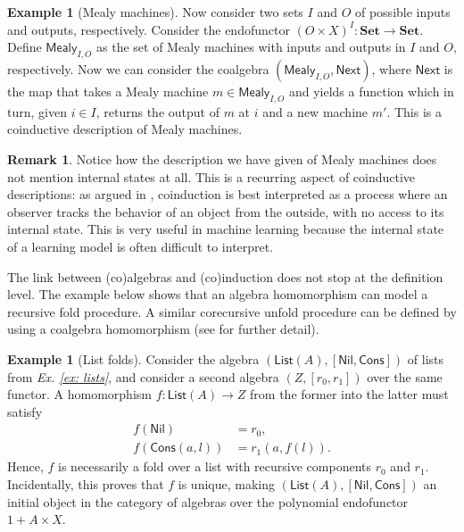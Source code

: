 \documentclass[11pt,a4paper,openright,twoside]{report}
\newcounter{mycounter}
\theoremstyle{plain}
\theoremstyle{definition}
\newtheorem{remark}[mycounter]{Remark}
\newtheorem{example}[mycounter]{Example}
\begin{document}
\begin{example}[Mealy machines]
  \label{ex: mealy}
  Now consider two sets $I$ and $O$ of possible inputs and outputs, respectively. Consider the endofunctor $(O \times X)^I: \mathbf{Set} \to \mathbf{Set}$.  Define $\mathsf{Mealy}_{I,O}$ as the set of Mealy machines with inputs and outputs in $I$ and $O$, respectively. Now we can consider the coalgebra $(\mathsf{Mealy}_{I,O}, \mathsf{Next})$, where $\mathsf{Next}$ is the map that takes a Mealy machine $m \in \mathsf{Mealy}_{I,O}$ and yields a function which in turn, given $i \in I$, returns the output of $m$ at $i$ and a new machine $m'$. This is a coinductive description of Mealy machines.
\end{example}

\begin{remark}
  Notice how the description we have given of Mealy machines does not mention internal states at all. This is a recurring aspect of coinductive descriptions: as argued in \cite{jacobs1997tutorial}, coinduction is best interpreted as a process where an observer tracks the behavior of an object from the outside, with no access to its internal state. This is very useful in machine learning because the internal state of a learning model is often difficult to interpret.
\end{remark}

The link between (co)algebras and (co)induction does not stop at the definition level. The example below shows that an algebra homomorphism can model a recursive fold procedure. A similar corecursive unfold procedure can be defined by using a coalgebra homomorphism (see \cite{gavranovicposition} for further detail).

\begin{example}[List folds]
  \label{ex: listfold}
  Consider the algebra $(\mathsf{List}(A), [\mathsf{Nil}, \mathsf{Cons}])$ of lists from \textit{Ex. \ref{ex: lists}}, and consider a second algebra $(Z, [r_0,r_1])$ over the same functor. A homomorphism $f: \mathsf{List}(A) \to Z$ from the former into the latter must satisfy 
  \begin{align*}
    f(\mathsf{Nil}) &= r_0,\\
    f(\mathsf{Cons}(a,l)) &= r_1(a,f(l)). 
  \end{align*}
  Hence, $f$ is necessarily a fold over a list with recursive components $r_0$ and $r_1$. Incidentally, this proves that $f$ is unique, making $(\mathsf{List}(A), [\mathsf{Nil}, \mathsf{Cons}])$ an initial object in the category of algebras over the polynomial endofunctor $1 + A \times X$.
\end{example}
\end{document}
